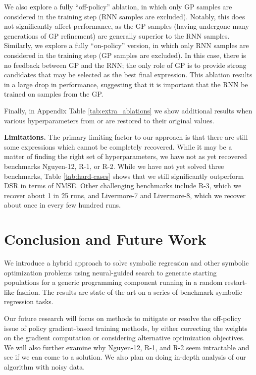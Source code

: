 \documentclass{article}
\begin{document}
We also explore a fully ``off-policy'' ablation, in which only GP samples are considered in the training step (RNN samples are excluded).
Notably, this does not significantly affect performance, as the GP samples (having undergone many generations of GP refinement) are generally superior to the RNN samples.
Similarly, we explore a fully ``on-policy'' version, in which only RNN samples are considered in the training step (GP samples are excluded).
In this case, there is no feedback between GP and the RNN; the only role of GP is to provide strong candidates that may be selected as the best final expression.
This ablation results in a large drop in performance, suggesting that it is important that the RNN be trained on samples from the GP.

Finally, in Appendix Table \ref{tab:extra_ablations} we show additional results when various hyperparameters from \citet{petersen2019deep} or \citet{deap2012} are restored to their original values.

\textbf{Limitations.}
The primary limiting factor to our approach is that there are still some expressions which cannot be completely recovered. 
While it may be a matter of finding the right set of hyperparameters, we have not as yet recovered benchmarks Nguyen-12, R-1, or R-2.
While we have not yet solved three benchmarks, Table \ref{tab:hard-cases} shows that we still significantly outperform DSR in terms of NMSE.
Other challenging benchmarks include R-3, which we recover about 1 in 25 runs, and Livermore-7 and Livermore-8, which we recover about once in every few hundred runs.

\section{Conclusion and Future Work}
We introduce a hybrid approach to solve symbolic regression and other symbolic optimization problems using neural-guided search to generate starting populations for a generic programming component running in a random restart-like fashion.
The results are state-of-the-art on a series of benchmark symbolic regression tasks.

Our future research will focus on methods to mitigate or resolve the off-policy issue of policy gradient-based training methods, by either correcting the weights on the gradient computation or considering alternative optimization objectives.
We will also further examine why Nguyen-12, R-1, and R-2 seem intractable and see if we can come to a solution.
We also plan on doing in-depth analysis of our algorithm with noisy data. 
\end{document}
